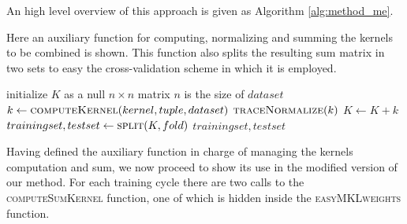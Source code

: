 An high level overview of this approach is given as Algorithm \ref{alg:method_me}.

\begin{algorithm}
    \caption{
        Here an auxiliary function for computing, normalizing and summing the
        kernels to be combined is shown.
        This function also splits the resulting sum matrix in two sets to
        easy the cross-validation scheme in which it is employed.
    }
    \label{alg:compute_sum}
    \begin{algorithmic}[1]
            \State initialize $K$ as a null $n\times n$ matrix
            \Comment $n$ is the size of $dataset$
                    \State $k \gets \Call{computeKernel}{kernel, tuple, dataset}$
                    \State $\Call{traceNormalize}{k}$
                    \State $K \gets K+k$
                \EndFor
            \EndFor
            \State $trainingset, testset \gets \Call{split}{K,fold}$
            \State \Return $trainingset, testset$
        \EndFunction
    \end{algorithmic}
\end{algorithm}

Having defined the auxiliary function in charge of managing the kernels computation
and sum, we now proceed to show its use in the modified version of our method.
For each training cycle there are two calls to the \textsc{computeSumKernel}
function, one of which is hidden inside the \textsc{easyMKLweights} function.

